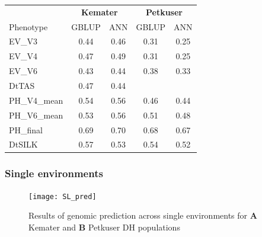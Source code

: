 \onehalfspacing
\begin{table}[H]
\centering
\begin{tabular}{lcc|cc}
  \toprule
  & \multicolumn{2}{c}{\textbf{Kemater}}  & \multicolumn{2}{c}{\textbf{Petkuser}} \\
  Phenotype & GBLUP & ANN & GBLUP & ANN \\ 
  \midrule
  EV\_V3 & 0.44 & 0.46 & 0.31 & 0.25 \\ 
  EV\_V4 & 0.47 & 0.49 & 0.31 & 0.25 \\ 
  EV\_V6 & 0.43 & 0.44 & 0.38 & 0.33 \\ 
  DtTAS & 0.47 & 0.44 &  &  \\ 
  PH\_V4\_mean & 0.54 & 0.56 & 0.46 & 0.44 \\ 
  PH\_V6\_mean & 0.53 & 0.56 & 0.51 & 0.48 \\ 
  PH\_final & 0.69 & 0.70 & 0.68 & 0.67 \\ 
  DtSILK & 0.57 & 0.53 & 0.54 & 0.52 \\ 
  \bottomrule
\end{tabular}
\end{table}
\doublespacing

\subsubsection{Single environments}

\begin{figure}[H]
  \centering \texttt{[image: SL\_pred]}
  \decoRule
  \caption[Results of genomic prediction across single environments for Kemater and Petkuser DH populations]{Results of genomic prediction across single environments for \textbf{A} Kemater  and \textbf{B} Petkuser DH populations}
\label{fig:sl_pred}
\end{figure}

